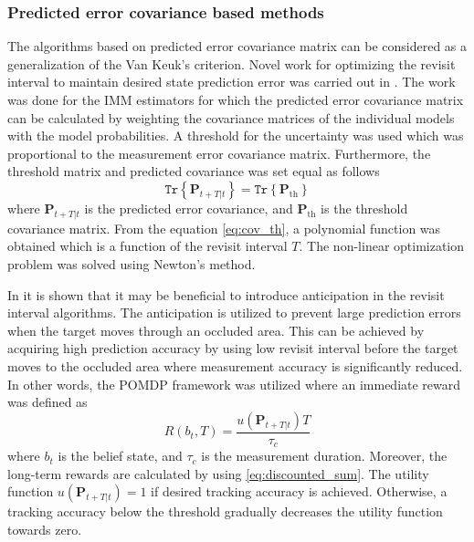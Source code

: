 \documentclass[english, 12pt, a4paper, elec, utf8, a-1b, online]{aaltothesis}
\renewcommand{\vec}[1]{\mathbf{#1}}
\newcommand{\tr}[1]{\texttt{Tr}\left\{ #1 \right\}}
\begin{document}
\subsubsection{Predicted error covariance based methods} \label{sec:error_covariance_methods}

The algorithms based on predicted error covariance matrix can be considered as a generalization of the Van Keuk's criterion.  
Novel work for optimizing the revisit interval to maintain desired state prediction error was carried out in \cite{Watson1993}.
The work was done for the IMM estimators for which the predicted error covariance matrix can be calculated by weighting the covariance matrices of the individual models with the model probabilities.
A threshold for the uncertainty was used which was proportional to the measurement error covariance matrix.
Furthermore, the threshold matrix and predicted covariance was set equal as follows  
\begin{equation}\label{eq:cov_th}
    \tr{ \vec{P}_{t+T|t} } = \tr{ \vec{P}_{\text{th}} }
\end{equation}
where $\vec{P}_{t+T|t}$ is the predicted error covariance, and $\vec{P}_{\text{th}}$ is the threshold covariance matrix.
From the equation \eqref{eq:cov_th}, a polynomial function was obtained which is a function of the revisit interval $T$.
The non-linear optimization problem was solved using Newton's method.



In \cite{Charlish2015} it is shown that it may be beneficial to introduce anticipation in the revisit interval algorithms.
The anticipation is utilized to prevent large prediction errors when the target moves through an occluded area.
This can be achieved by acquiring high prediction accuracy by using low revisit interval before the target moves to the occluded area where measurement accuracy is significantly reduced.
In other words, the POMDP framework was utilized where an immediate reward was defined as
\begin{equation}
    R(b_t, T) = \frac{u\left(\vec{P}_{t+T|t} \right) T}{\tau_c}
\end{equation}
where $b_t$ is the belief state, and $\tau_c$ is the measurement duration.
Moreover, the long-term rewards are calculated by using \eqref{eq:discounted_sum}.
The utility function $u\left(\vec{P}_{t+T|t} \right)=1$ if desired tracking accuracy is achieved.
Otherwise, a tracking accuracy below the threshold gradually decreases the utility function towards zero.
\end{document}
